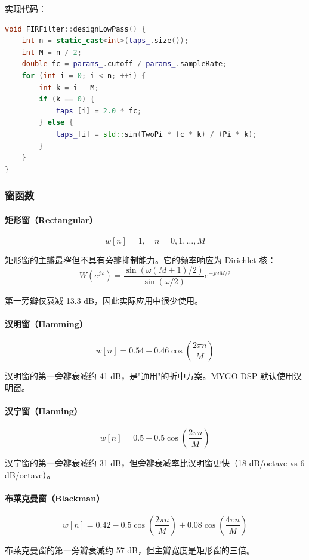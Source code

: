 ﻿\documentclass[12pt,a4paper,oneside]{ctexbook}
\begin{document}
实现代码：
\begin{lstlisting}[language=C++, caption={设计低通 FIR 系数}]
void FIRFilter::designLowPass() {
    int n = static_cast<int>(taps_.size());
    int M = n / 2;
    double fc = params_.cutoff / params_.sampleRate;
    for (int i = 0; i < n; ++i) {
        int k = i - M;
        if (k == 0) {
            taps_[i] = 2.0 * fc;
        } else {
            taps_[i] = std::sin(TwoPi * fc * k) / (Pi * k);
        }
    }
}
\end{lstlisting}

\subsubsection{窗函数}

\paragraph{矩形窗（Rectangular）}
\[
w[n] = 1, \quad n = 0, 1, \ldots, M
\]

矩形窗的主瓣最窄但不具有旁瓣抑制能力。它的频率响应为 Dirichlet 核：
\[
W(e^{j\omega}) = \frac{\sin(\omega(M+1)/2)}{\sin(\omega/2)} e^{-j\omega M/2}
\]

第一旁瓣仅衰减 13.3 dB，因此实际应用中很少使用。

\paragraph{汉明窗（Hamming）}
\[
w[n] = 0.54 - 0.46 \cos\left(\frac{2\pi n}{M}\right)
\]

汉明窗的第一旁瓣衰减约 41 dB，是"通用"的折中方案。MYGO-DSP 默认使用汉明窗。

\paragraph{汉宁窗（Hanning）}
\[
w[n] = 0.5 - 0.5 \cos\left(\frac{2\pi n}{M}\right)
\]

汉宁窗的第一旁瓣衰减约 31 dB，但旁瓣衰减率比汉明窗更快（18 dB/octave vs 6 dB/octave）。

\paragraph{布莱克曼窗（Blackman）}
\[
w[n] = 0.42 - 0.5 \cos\left(\frac{2\pi n}{M}\right) + 0.08 \cos\left(\frac{4\pi n}{M}\right)
\]

布莱克曼窗的第一旁瓣衰减约 57 dB，但主瓣宽度是矩形窗的三倍。
\end{document}
